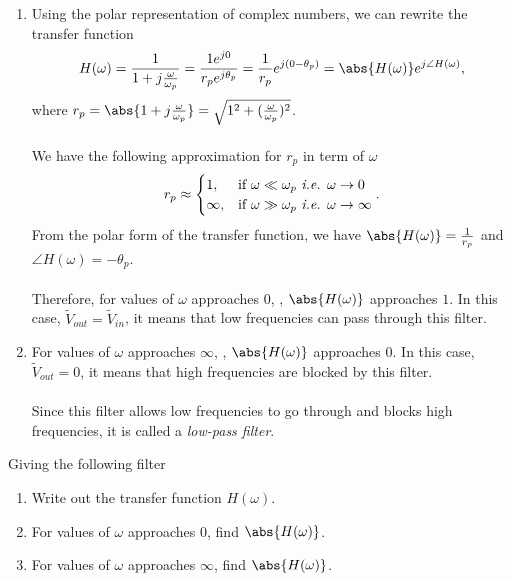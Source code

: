 \begin{enumerate}
{\begin{enumerate}
  \item Using the polar representation of complex numbers, we can rewrite the transfer function
    \[
      H(\omega) = \frac{1}{1 + j\frac{\omega}{\omega_p}}
      = \frac{1e^{j0}}{r_pe^{j\theta_p}}
      = \frac{1}{r_p}e^{j(0 - \theta_p)}
      = \abs{H(\omega)}e^{j\angle{H(\omega)}}
    ,\]
    where $r_p = \abs{1 + j\frac{\omega}{\omega_p}} = \sqrt{1^{2} + (\frac{\omega}{\omega_p})^{2}}$.
    \\
    \\
    We have the following approximation for $r_p$ in term of $\omega$
    \[
      r_p \approx
      \begin{cases}
        1,      & \text{if } \omega \ll \omega_p \text{ \it i.e. } \omega \rightarrow 0 \\
        \infty, & \text{if } \omega \gg \omega_p \text{ \it i.e. } \omega \rightarrow \infty
      \end{cases}
    .\]
    From the polar form of the transfer function, we have $\abs{H(\omega)} = \frac{1}{r_p}$ and $\angle{H(\omega) = - \theta_p}$.
    \\
    \\
    Therefore, for values of $\omega$ approaches $0$, , $\abs{H(\omega)}$ approaches $1$.
    In this case, $\widetilde{V}_{out} = \widetilde{V}_{in}$, it means that low frequencies can pass through this filter.

  \item For values of $\omega$ approaches $\infty$, , $\abs{H(\omega)}$ approaches $0$.
    In this case, $\widetilde{V}_{out} = 0$, it means that high frequencies are blocked by this filter.
    \\
    \\
    Since this filter allows low frequencies to go through and blocks high frequencies, it is called a \emph{low-pass filter}.

\end{enumerate}
}



\qitem Giving the following filter



\begin{enumerate}
  \item Write out the transfer function $H(\omega)$.
  \item For values of $\omega$ approaches $0$, find $\abs{H(\omega)}$.
  \item For values of $\omega$ approaches $\infty$, find $\abs{H(\omega)}$.
\end{enumerate}


\end{enumerate}
